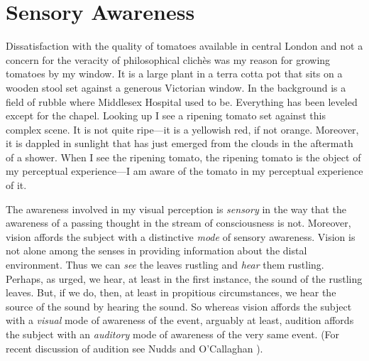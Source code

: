 \documentclass[12pt]{article}
\begin{document}
\section{Sensory Awareness} %
\label{sec:sensory_awareness}

Dissatisfaction with the quality of tomatoes available in central London and not a concern for the veracity of philosophical clichès was my reason for growing tomatoes by my window. It is a large plant in a terra cotta pot that sits on a wooden stool set against a generous Victorian window. In the background is a field of rubble where Middlesex Hospital used to be. Everything has been leveled except for the chapel. Looking up I see a ripening tomato set against this complex scene. It is not quite ripe---it is a yellowish red, if not orange. Moreover, it is dappled in sunlight that has just emerged from the clouds in the aftermath of a shower. When I see the ripening tomato, the ripening tomato is the object of my perceptual experience---I am aware of the tomato in my perceptual experience of it. 

The awareness involved in my visual perception is \emph{sensory} in the way that the awareness of a passing thought in the stream of consciousness is not. Moreover, vision affords the subject with a distinctive \emph{mode} of sensory awareness. Vision is not alone among the senses in providing information about the distal environment. Thus we can \emph{see} the leaves rustling and \emph{hear} them rustling. Perhaps, as \citet[]{Berkeley:1734fk} urged, we hear, at least in the first instance, the sound of the rustling leaves. But, if we do, then, at least in propitious circumstances, we hear the source of the sound by hearing the sound. So whereas vision affords the subject with a \emph{visual} mode of awareness of the event, arguably at least, audition affords the subject with an \emph{auditory} mode of awareness of the very same event. (For recent discussion of audition see Nudds and O'Callaghan \citeyear{Nudds:2009sk}).
\end{document}
